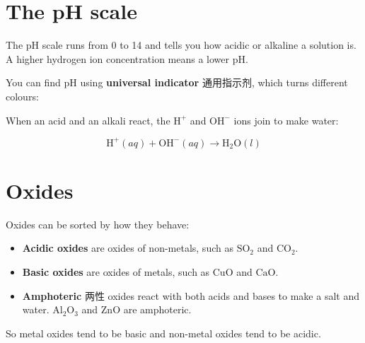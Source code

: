 \documentclass[11pt]{article}
\begin{document}
\section*{The pH scale}

The pH scale runs from 0 to 14 and tells you how acidic or alkaline a solution is. A higher hydrogen ion concentration means a lower pH.

You can find pH using \textbf{universal indicator} 通用指示剂, which turns different colours:

\begin{center}
\end{center}

When an acid and an alkali react, the $\text{H}^{+}$ and $\text{OH}^{-}$ ions join to make water:

\[
\text{H}^{+}(aq) + \text{OH}^{-}(aq) \rightarrow \text{H}_2\text{O}(l)
\]

\section*{Oxides}

Oxides can be sorted by how they behave:

\begin{itemize}
\item \textbf{Acidic oxides} are oxides of non-metals, such as $\text{SO}_2$ and $\text{CO}_2$.

\item \textbf{Basic oxides} are oxides of metals, such as $\text{CuO}$ and $\text{CaO}$.

\item \textbf{Amphoteric} 两性 oxides react with both acids and bases to make a salt and water. $\text{Al}_2\text{O}_3$ and $\text{ZnO}$ are amphoteric.

\end{itemize}

So metal oxides tend to be basic and non-metal oxides tend to be acidic.
\end{document}
